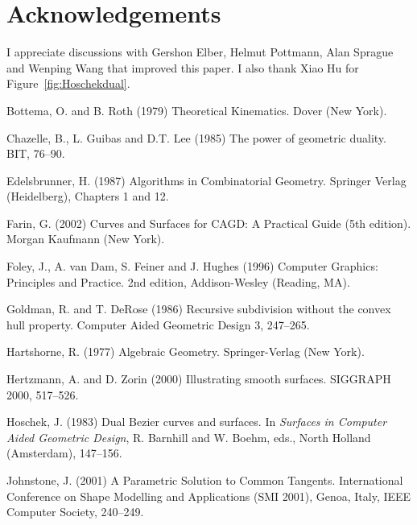 \documentclass[12pt]{article}
\begin{document}

\section{Acknowledgements}

I appreciate discussions with Gershon Elber, Helmut Pottmann, Alan Sprague
and Wenping Wang that improved this paper.
I also thank Xiao Hu for Figure~\ref{fig:Hoschekdual}.



\begin{thebibliography}{99}	%

Bottema, O. and B. Roth (1979)
Theoretical Kinematics.
Dover (New York).

Chazelle, B., L. Guibas and D.T. Lee (1985)
The power of geometric duality.
BIT, 76--90.

Edelsbrunner, H. (1987)
Algorithms in Combinatorial Geometry.
Springer Verlag (Heidelberg), Chapters 1 and 12.

Farin, G. (2002)
Curves and Surfaces for CAGD: A Practical Guide (5th edition).
Morgan Kaufmann (New York).

Foley, J., A. van Dam, S. Feiner and J. Hughes (1996)
Computer Graphics: Principles and Practice.
2nd edition, Addison-Wesley (Reading, MA).

Goldman, R. and T. DeRose (1986)
Recursive subdivision without the convex hull property.
Computer Aided Geometric Design 3, 247--265.

Hartshorne, R. (1977)
Algebraic Geometry.
Springer-Verlag (New York).

Hertzmann, A. and D. Zorin (2000)
Illustrating smooth surfaces.
SIGGRAPH 2000, 517--526.

Hoschek, J. (1983)
Dual Bezier curves and surfaces.
In {\em Surfaces in Computer Aided Geometric Design},
R. Barnhill and W. Boehm, eds.,
North Holland (Amsterdam), 147--156.

Johnstone, J. (2001)
A Parametric Solution to Common Tangents.
International Conference on Shape Modelling and Applications (SMI 2001), Genoa, Italy,
IEEE Computer Society, 240--249.


\end{thebibliography}
\end{document}
